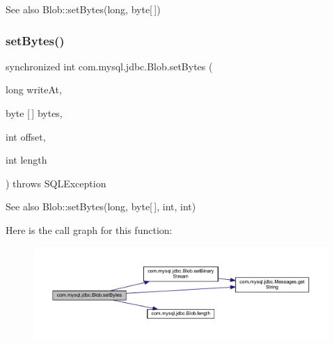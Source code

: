\begin{DoxySeeAlso}{See also}
Blob\+::set\+Bytes(long, byte\mbox{[}$\,$\mbox{]}) 
\end{DoxySeeAlso}
\mbox{\label{classcom_1_1mysql_1_1jdbc_1_1_blob_a17fdc870a0ed05ef0d500c874115e3dd}} 
\subsubsection{\texorpdfstring{set\+Bytes()}{setBytes()}\hspace{0.1cm}{\footnotesize\ttfamily [2/2]}}
{\footnotesize\ttfamily synchronized int com.\+mysql.\+jdbc.\+Blob.\+set\+Bytes (\begin{DoxyParamCaption}\item[{long}]{write\+At,  }\item[{byte \mbox{[}$\,$\mbox{]}}]{bytes,  }\item[{int}]{offset,  }\item[{int}]{length }\end{DoxyParamCaption}) throws S\+Q\+L\+Exception}

\begin{DoxySeeAlso}{See also}
Blob\+::set\+Bytes(long, byte\mbox{[}$\,$\mbox{]}, int, int) 
\end{DoxySeeAlso}
Here is the call graph for this function\+:\nopagebreak
\begin{figure}[H]
\begin{center}
\leavevmode
\includegraphics[width=350pt]{classcom_1_1mysql_1_1jdbc_1_1_blob_a17fdc870a0ed05ef0d500c874115e3dd_cgraph}
\end{center}
\end{figure}
\mbox{\label{classcom_1_1mysql_1_1jdbc_1_1_blob_a8e4bb5f28a7f31220f2817cc8765d8b1}} 
